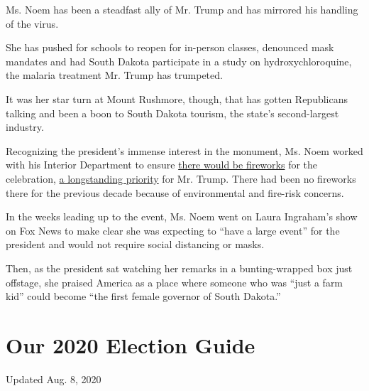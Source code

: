 Ms. Noem has been a steadfast ally of Mr. Trump and has mirrored his
handling of the virus.

She has pushed for schools to reopen for in-person classes, denounced
mask mandates and had South Dakota participate in a study on
hydroxychloroquine, the malaria treatment Mr. Trump has trumpeted.

It was her star turn at Mount Rushmore, though, that has gotten
Republicans talking and been a boon to South Dakota tourism, the state's
second-largest industry.

Recognizing the president's immense interest in the monument, Ms. Noem
worked with his Interior Department to ensure
\href{https://www.whitehouse.gov/briefings-statements/remarks-president-trump-signing-u-s-china-phase-one-trade-agreement-2/}{there
would be fireworks} for the celebration,
\href{https://twitter.com/realDonaldTrump/status/1125941300518432771}{a
longstanding priority} for Mr. Trump. There had been no fireworks there
for the previous decade because of environmental and fire-risk concerns.

In the weeks leading up to the event, Ms. Noem went on Laura Ingraham's
show on Fox News to make clear she was expecting to ``have a large
event'' for the president and would not require social distancing or
masks.

Then, as the president sat watching her remarks in a bunting-wrapped box
just offstage, she praised America as a place where someone who was
``just a farm kid'' could become ``the first female governor of South
Dakota.''

\hypertarget{our-2020-election-guide}{%
\section{Our 2020 Election Guide}\label{our-2020-election-guide}}

Updated Aug. 8, 2020

